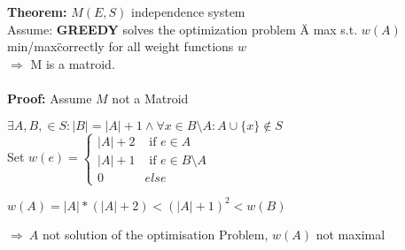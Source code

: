 \textbf{Theorem: } $M(E, S)$ independence system\\
Assume: \textbf{GREEDY} solves the optimization problem \"A max s.t. $w(A)$ min/max\" correctly for all weight functions $w$\\
$\Rightarrow$ M is a matroid.\\\\
\textbf{Proof: } Assume $M$ not a Matroid
\begin{compactenum}
	\item{
	$\exists A, B, \in S: |B| = |A| + 1 \land \forall x \in B \setminus A: A\cup \{x\} \notin S$\\
	Set $w(e) = \begin{cases} 	|A| + 2 & \text{ if } e\in A\\
								|A| + 1 & \text{ if } e \in B\setminus A\\
								0 & else
				\end{cases} $
	}
	\item{
	$w(A) = |A| * (|A| + 2) < (|A| + 1)^2 < w(B)$
	}
	\item{
	$\Rightarrow~A$ not solution of the optimisation Problem, $w(A)$ not maximal
	}
\end{compactenum}
